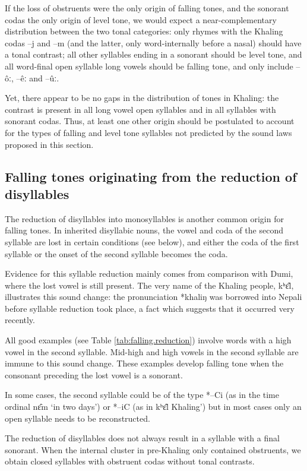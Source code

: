\documentclass[oldfontcommands,oneside,a4paper,11pt]{article}
\newcommand{\ipa}[1]{{\phon \mbox{#1}}} %
\begin{document}
If the loss of obstruents were the only origin of falling tones, and the sonorant codas the only origin of level tone, we would expect a near-complementary distribution between the two tonal categories: only rhymes with the Khaling codas \ipa{--j} and \ipa{--m} (and the latter, only word-internally before a nasal) should have a tonal contrast; all other syllables ending in a sonorant should be level tone, and all word-final open syllable long vowels should be falling tone, and only include \ipa{--ôː}, \ipa{--êː} and \ipa{--ûː}.

Yet, there appear to be no gaps in the distribution of tones in Khaling: the contrast is present in all long vowel open syllables and in all syllables with sonorant codas. Thus, at least one other origin should be postulated to account for the types of falling and level tone syllables not predicted by the sound laws proposed in this section.

\subsection{Falling tones originating from the reduction of disyllables} \label{sec:disyll}
The reduction of disyllables into monosyllables is another common origin for falling tones. In inherited disyllabic nouns, the vowel and coda of the second syllable are   lost in certain conditions (see below), and either the coda of the first syllable or the onset of the second syllable becomes the coda.

Evidence for this syllable reduction mainly comes from comparison with Dumi, where the lost vowel is still present. The very name of the Khaling people, \ipa{kʰɛ‍̂l}, illustrates this sound change: the pronunciation \ipa{*khaliŋ}		was borrowed into Nepali before syllable reduction took place, a fact which suggests that it occurred very recently.

All good examples (see Table \ref{tab:falling.reduction}) involve words with a high vowel in the second syllable. Mid-high and high vowels in the second syllable are immune to this sound change. These examples develop falling tone when the consonant preceding the lost vowel is a sonorant.

In some cases, the second syllable could be of the type *--Ci (as in the time ordinal \ipa{nɛ̂m}  `in two days') or *--iC (as in \ipa{kʰɛ‍̂l}  Khaling') but in most cases only an open syllable  needs to be reconstructed.

The reduction of disyllables does not always result in a syllable with a final sonorant. When the internal cluster in pre-Khaling only contained obstruents, we obtain closed syllables with obstruent codas without tonal contrasts. 
\end{document}
